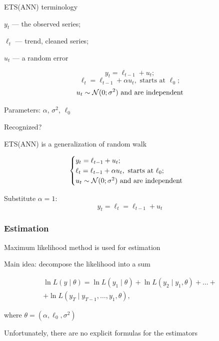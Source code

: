 \begin{frame}{ETS(ANN) terminology}
	
	$y_t$ — the observed series;
	
	$\ell_t$ — trend, cleaned series;
	
	$u_t$ — a random error
	
	\pause
	\[
	y_t = \ell_{t-1} + u_t;
	\]
	\pause
	\[
	\ell_t = \ell_{t-1} + \alpha u_t, \text{ starts at } \ell_0;
	\]
	\pause
	\[
	u_t \sim \mathcal{N}(0;\sigma^2) \text{ and are independent}
	\]
	\pause
	
	Parameters: $\alpha$, $\sigma^2$, $\ell_0$
\end{frame}




\begin{frame}{Recognized?}
	
	ETS(ANN) is a generalization of \alert{random walk}
	\pause
	
	\[
	\begin{cases}
		y_t = \ell_{t-1} + u_t; \\
		\ell_t = \ell_{t-1} + \alpha u_t, \text{ starts at } \ell_0; \\
		u_t \sim \mathcal{N}(0;\sigma^2) \text{ and are independent} \\
	\end{cases}
	\]
	
	\pause
	Substitute $\alpha = 1$:
	\[
	y_t = \ell_t = \ell_{t-1} + u_t
	\]
	
\end{frame}


\begin{frame}
	\frametitle{Estimation}
	
	\alert{Maximum likelihood method} is used for estimation
	
	\pause
	Main idea: \alert{decompose} the likelihood into a sum
	
	\begin{multline*}
		\ln L(y \mid \theta) = \ln L(y_1 \mid \theta) + \ln L(y_2 \mid y_1, \theta) + \ldots + \\
		+ \ln L(y_T \mid y_{T-1}, \ldots, y_1, \theta),
	\end{multline*}
	
	where $\theta = (\alpha, \ell_0, \sigma^2)$
	
	\pause
	Unfortunately, there are no explicit formulas for the estimators
	
\end{frame}


